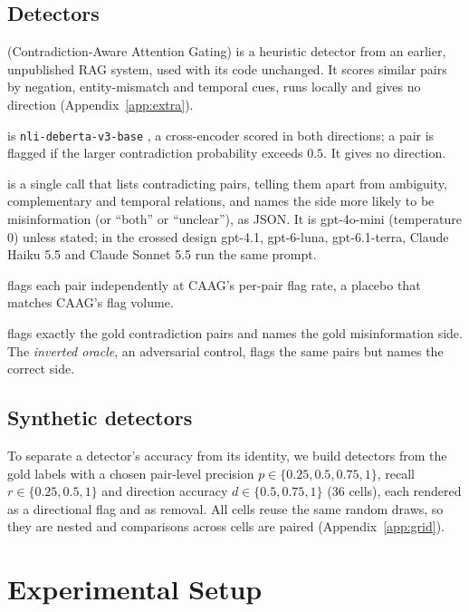 \subsection{Detectors}
\label{sec:detectors}
\begin{description}[leftmargin=0pt,itemsep=1pt,topsep=2pt]
\item[CAAG] (Contradiction-Aware Attention Gating) is a heuristic detector from an earlier, unpublished RAG system,
used with its code unchanged. It scores similar pairs by negation, entity-mismatch and temporal cues, runs locally
and gives no direction (Appendix~\ref{app:extra}).
\item[NLI] is \texttt{nli-deberta-v3-base} \citep{he2023debertav3}, a cross-encoder scored in both directions; a pair is
flagged if the larger contradiction probability exceeds $0.5$. It gives no direction.
\item[LLM] is a single call that lists contradicting pairs, telling them apart from ambiguity, complementary and
temporal relations, and names the side more likely to be misinformation (or ``both'' or ``unclear''), as JSON. It is
gpt-4o-mini (temperature 0) unless stated; in the crossed design gpt-4.1, gpt-6-luna, gpt-6.1-terra, Claude Haiku 5.5
and Claude Sonnet 5.5 run the same prompt.
\item[Random] flags each pair independently at CAAG's per-pair flag rate, a placebo that matches CAAG's flag volume.
\item[Oracle] flags exactly the gold contradiction pairs and names the gold misinformation side. The
\emph{inverted oracle}, an adversarial control, flags the same pairs but names the correct side.
\end{description}

\subsection{Synthetic detectors}
\label{sec:synthetic}
To separate a detector's accuracy from its identity, we build detectors from the gold labels with a chosen pair-level
precision $p\in\{0.25,0.5,0.75,1\}$, recall $r\in\{0.25,0.5,1\}$ and direction accuracy $d\in\{0.5,0.75,1\}$ (36
cells), each rendered as a directional flag and as removal. All cells reuse the same random draws, so they are nested
and comparisons across cells are paired (Appendix~\ref{app:grid}).
\section{Experimental Setup}
\label{sec:setup}

